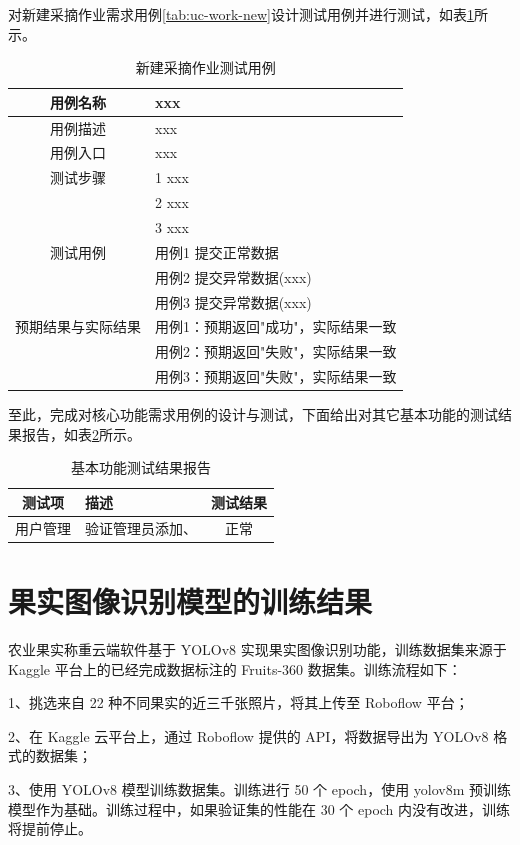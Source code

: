 对新建采摘作业需求用例\ref{tab:uc-work-new}设计测试用例并进行测试，如表\ref{tab:uc-work-new-test}所示。

\begin{longtable}[ht]{|c|p{8cm}|}
\caption{新建采摘作业测试用例}
\label{tab:uc-work-new-test}
\\
\hline
用例名称 & xxx \\
\hline
用例描述 & xxx \\
\hline
用例入口 & xxx \\
\hline
测试步骤 & 1 xxx \\
& 2 xxx \\
& 3 xxx \\
\hline
测试用例 & 用例1 提交正常数据 \\
& 用例2 提交异常数据(xxx) \\
& 用例3 提交异常数据(xxx) \\
\hline
预期结果与实际结果 & 用例1：预期返回"成功"，实际结果一致 \\
& 用例2：预期返回"失败"，实际结果一致 \\
& 用例3：预期返回"失败"，实际结果一致 \\
\hline
\end{longtable}

至此，完成对核心功能需求用例的设计与测试，下面给出对其它基本功能的测试结果报告，如表\ref{tab:test-result-summary}所示。

\begin{longtable}[ht]{|c|p{8cm}|c|}
\caption{基本功能测试结果报告}
\label{tab:test-result-summary}
\\
\hline
测试项 & 描述 & 测试结果 \\
\hline
用户管理 & 验证管理员添加、 & 正常 \\
\hline
\end{longtable}

\section{果实图像识别模型的训练结果}\label{sec:test-model}

农业果实称重云端软件基于 YOLOv8 实现果实图像识别功能，训练数据集来源于 Kaggle 平台上的已经完成数据标注的 Fruits-360 数据集。训练流程如下：

1、挑选来自 22 种不同果实的近三千张照片，将其上传至 Roboflow 平台；

2、在 Kaggle 云平台上，通过 Roboflow 提供的 API，将数据导出为 YOLOv8 格式的数据集；

3、使用 YOLOv8 模型训练数据集。训练进行 50 个 epoch，使用 yolov8m 预训练模型作为基础。训练过程中，如果验证集的性能在 30 个 epoch 内没有改进，训练将提前停止。

